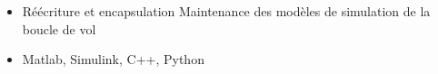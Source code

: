 \begin{itemize}
{{{    \begin{itemize}
        \item {Réécriture et encapsulation Maintenance des modèles de simulation de la boucle de vol}
        \item {Matlab, Simulink, C++, Python}
    \end{itemize}
    }
    }
    {}
    }

    
    
    

\end{itemize}
